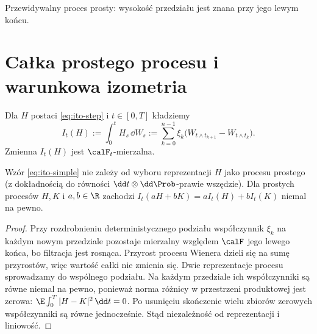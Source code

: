 \begin{center}
\par\smallskip\small Przewidywalny proces prosty: wysokość przedziału jest znana przy jego lewym końcu.
\end{center}

\section{Całka prostego procesu i warunkowa izometria}
\begin{definicja}
Dla $H$ postaci \eqref{eq:ito-step} i $t\in[0,T]$ kładziemy
\[
I_t(H):=\int_0^t H_s\,\dd W_s
:=\sum_{k=0}^{n-1}\xi_k
\big(W_{t\wedge t_{k+1}}-W_{t\wedge t_k}\big).
\tag{2.2}\label{eq:ito-simple}
\]
Zmienna $I_t(H)$ jest $\calF_t$-mierzalna.
\end{definicja}

\begin{lemat}
Wzór \eqref{eq:ito-simple} nie zależy od wyboru
reprezentacji $H$ jako procesu prostego (z dokładnością
do równości $\dd t\otimes\dd\Prob$-prawie wszędzie).
Dla prostych procesów $H,K$ i $a,b\in\R$ zachodzi
$I_t(aH+bK)=aI_t(H)+bI_t(K)$ niemal na pewno.
\end{lemat}
\begin{proof}
Przy rozdrobnieniu deterministycznego podziału współczynnik
$\xi_k$ na każdym nowym przedziale pozostaje mierzalny
względem $\calF$ jego lewego końca, bo filtracja jest rosnąca.
Przyrost procesu Wienera dzieli się na sumę przyrostów,
więc wartość całki nie zmienia się. Dwie reprezentacje
procesu sprowadzamy do wspólnego podziału. Na każdym
przedziale ich współczynniki są równe niemal na pewno,
ponieważ norma różnicy w przestrzeni produktowej jest zerowa:
$\E\int_0^T|H-K|^2\,\dd t=0$.
Po usunięciu skończenie wielu zbiorów zerowych
współczynniki są równe jednocześnie. Stąd niezależność
od reprezentacji i liniowość.
\end{proof}

